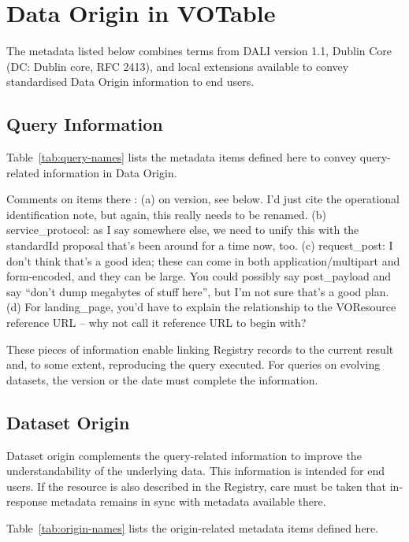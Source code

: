 \documentclass[11pt,a4paper]{ivoa}
\begin{document}
\section{Data Origin in VOTable}
\label{sect:invotable}

The metadata listed below combines terms from DALI version 1.1, Dublin Core (DC: Dublin core, RFC 2413), and local extensions available to convey standardised Data Origin information to end users.

\subsection{Query Information}
Table~\ref{tab:query-names} lists the metadata items defined here to
convey query-related information in Data Origin.

Comments on items there 
: (a) on version, see below.  I'd just cite the operational identification note, but again, this really needs to be renamed.  (b) service\_protocol: as I say somewhere else, we need to unify this with the standardId proposal that's been around for a time now, too.  (c) request\_post: I don't think that's a good idea; these can come in both application/multipart and form-encoded, and they can be large.  You could possibly say post\_payload and say ``don't dump megabytes of stuff here'', but I'm not sure that's a good plan. (d) For landing\_page, you'd have to explain the relationship to the VOResource reference URL -- why not call it reference URL to begin with?

These pieces of information enable linking Registry records to the
current result and, to some extent, reproducing the query executed. For
queries on evolving datasets, the version or the date must complete the
information.

\subsection{Dataset Origin}
Dataset origin complements the query-related information to improve the
understandability of the underlying data. This information is intended
for end users.  If the resource is also described in the Registry, care
must be taken that in-response metadata remains in sync with metadata
available there.


Table~\ref{tab:origin-names} lists the origin-related metadata items
defined here.
\end{document}
